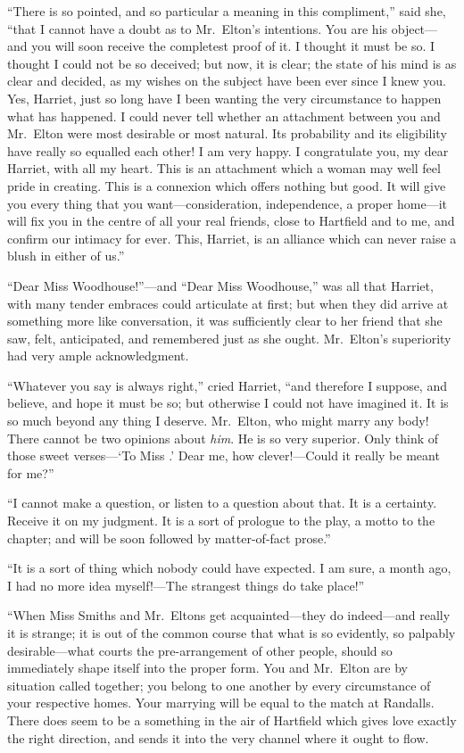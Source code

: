 ``There is so pointed, and so particular a meaning in this compliment,''
said she, ``that I cannot have a doubt as to Mr.\ Elton's intentions.
You are his object---and you will soon receive the completest proof
of it.  I thought it must be so.  I thought I could not be so deceived;
but now, it is clear; the state of his mind is as clear and decided,
as my wishes on the subject have been ever since I knew you.
Yes, Harriet, just so long have I been wanting the very circumstance
to happen what has happened.  I could never tell whether an attachment
between you and Mr.\ Elton were most desirable or most natural.
Its probability and its eligibility have really so equalled each
other! I am very happy.  I congratulate you, my dear Harriet, with all
my heart.  This is an attachment which a woman may well feel pride
in creating.  This is a connexion which offers nothing but good.
It will give you every thing that you want---consideration, independence,
a proper home---it will fix you in the centre of all your real friends,
close to Hartfield and to me, and confirm our intimacy for ever.
This, Harriet, is an alliance which can never raise a blush in either
of us.''

``Dear Miss Woodhouse!''---and ``Dear Miss Woodhouse,'' was all that Harriet,
with many tender embraces could articulate at first; but when they
did arrive at something more like conversation, it was sufficiently
clear to her friend that she saw, felt, anticipated, and remembered
just as she ought.  Mr.\ Elton's superiority had very ample acknowledgment.

``Whatever you say is always right,'' cried Harriet, ``and therefore
I suppose, and believe, and hope it must be so; but otherwise I could
not have imagined it.  It is so much beyond any thing I deserve.
Mr.\ Elton, who might marry any body! There cannot be two opinions
about \emph{him}.  He is so very superior.  Only think of those sweet
verses---`To Miss \gdash{}.' Dear me, how clever!---Could it really
be meant for me?''

``I cannot make a question, or listen to a question about that.
It is a certainty.  Receive it on my judgment.  It is a sort
of prologue to the play, a motto to the chapter; and will be soon
followed by matter-of-fact prose.''

``It is a sort of thing which nobody could have expected.  I am sure,
a month ago, I had no more idea myself!---The strangest things do
take place!''

``When Miss Smiths and Mr.\ Eltons get acquainted---they do indeed---and
really it is strange; it is out of the common course that what is
so evidently, so palpably desirable---what courts the pre-arrangement
of other people, should so immediately shape itself into the proper form.
You and Mr.\ Elton are by situation called together; you belong
to one another by every circumstance of your respective homes.
Your marrying will be equal to the match at Randalls.  There does
seem to be a something in the air of Hartfield which gives love
exactly the right direction, and sends it into the very channel
where it ought to flow.

